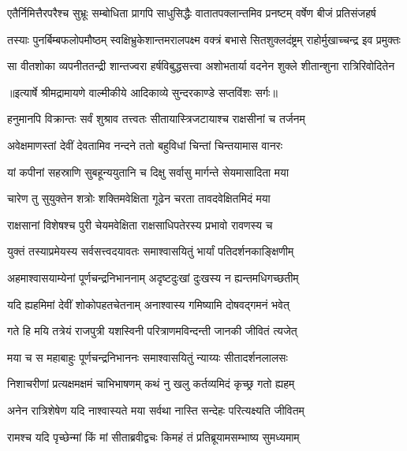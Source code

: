 \fourlineindentedshloka
{एतैर्निमित्तैरपरैश्च सुभ्रूः}
{सम्बोधिता प्रागपि साधुसिद्धैः}
{वातातपक्लान्तमिव प्रनष्टम्}
{वर्षेण बीजं प्रतिसंजहर्ष} %

\fourlineindentedshloka
{तस्याः पुनर्बिम्बफलोपमौष्ठम्}
{स्वक्षिभ्रुकेशान्तमरालपक्ष्म}
{वक्त्रं बभासे सितशुक्लदंष्ट्रम्}
{राहोर्मुखाच्चन्द्र इव प्रमुक्तः} %

\fourlineindentedshloka
{सा वीतशोका व्यपनीततन्द्री}
{शान्तज्वरा हर्षविबुद्धसत्त्वा}
{अशोभतार्या वदनेन शुक्ले}
{शीतान्शुना रात्रिरिवोदितेन} %


{॥इत्यार्षे श्रीमद्रामायणे वाल्मीकीये आदिकाव्ये सुन्दरकाण्डे सप्तविंशः सर्गः॥}


\twolineshloka
{हनुमानपि विक्रान्तः सर्वं शुश्राव तत्त्वतः}
{सीतायास्त्रिजटायाश्च राक्षसीनां च तर्जनम्} %

\twolineshloka
{अवेक्षमाणस्तां देवीं देवतामिव नन्दने}
{ततो बहुविधां चिन्तां चिन्तयामास वानरः} %

\twolineshloka
{यां कपीनां सहस्राणि सुबहून्ययुतानि च}
{दिक्षु सर्वासु मार्गन्ते सेयमासादिता मया} %

\twolineshloka
{चारेण तु सुयुक्तेन शत्रोः शक्तिमवेक्षिता}
{गूढेन चरता तावदवेक्षितमिदं मया} %

\twolineshloka
{राक्षसानां विशेषश्च पुरी चेयमवेक्षिता}
{राक्षसाधिपतेरस्य प्रभावो रावणस्य च} %

\twolineshloka
{युक्तं तस्याप्रमेयस्य सर्वसत्त्वदयावतः}
{समाश्वासयितुं भार्यां पतिदर्शनकाङ्क्षिणीम्} %

\twolineshloka
{अहमाश्वासयाम्येनां पूर्णचन्द्रनिभाननाम्}
{अदृष्टदुःखां दुःखस्य न ह्यन्तमधिगच्छतीम्} %

\twolineshloka
{यदि ह्यहमिमां देवीं शोकोपहतचेतनाम्}
{अनाश्वास्य गमिष्यामि दोषवद्गमनं भवेत्} %

\twolineshloka
{गते हि मयि तत्रेयं राजपुत्री यशस्विनी}
{परित्राणमविन्दन्ती जानकी जीवितं त्यजेत्} %

\twolineshloka
{मया च स महाबाहुः पूर्णचन्द्रनिभाननः}
{समाश्वासयितुं न्याय्यः सीतादर्शनलालसः} %

\twolineshloka
{निशाचरीणां प्रत्यक्षमक्षमं चाभिभाषणम्}
{कथं नु खलु कर्तव्यमिदं कृच्छ्र गतो ह्यहम्} %

\twolineshloka
{अनेन रात्रिशेषेण यदि नाश्वास्यते मया}
{सर्वथा नास्ति सन्देहः परित्यक्ष्यति जीवितम्} %

\twolineshloka
{रामश्च यदि पृच्छेन्मां किं मां सीताब्रवीद्वचः}
{किमहं तं प्रतिब्रूयामसम्भाष्य सुमध्यमाम्} %

